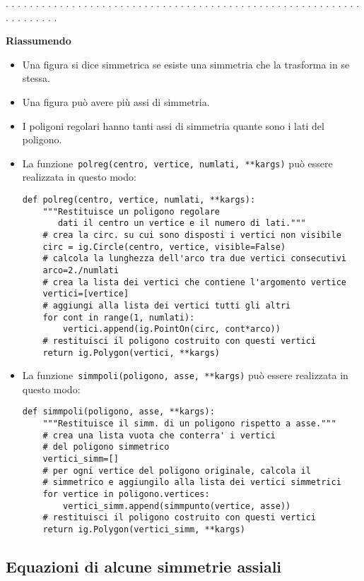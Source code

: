 . . . . . . . . . . . . . . . . . . . . . . . . . . . . . . . . . . . . . . . .
. . . . . . . . . . . . . . . . . . . . . . . . . . . .

\textbf{Riassumendo}
\begin{itemize} [noitemsep]
\item Una figura si dice simmetrica se esiste una simmetria che la trasforma in
se stessa.
\item Una figura può avere più assi di simmetria.
\item I poligoni regolari hanno tanti assi di simmetria quante sono i lati del
poligono.
\item La funzione~\lstinline{polreg(centro, vertice, numlati, **kargs)} può 
essere
realizzata in questo modo:

\begin{lstlisting}
def polreg(centro, vertice, numlati, **kargs):
    """Restituisce un poligono regolare 
       dati il centro un vertice e il numero di lati."""
    # crea la circ. su cui sono disposti i vertici non visibile
    circ = ig.Circle(centro, vertice, visible=False)
    # calcola la lunghezza dell'arco tra due vertici consecutivi
    arco=2./numlati
    # crea la lista dei vertici che contiene l'argomento vertice
    vertici=[vertice]
    # aggiungi alla lista dei vertici tutti gli altri
    for cont in range(1, numlati):
        vertici.append(ig.PointOn(circ, cont*arco))
    # restituisci il poligono costruito con questi vertici
    return ig.Polygon(vertici, **kargs)
\end{lstlisting}
\item La funzione~\lstinline{simmpoli(poligono, asse, **kargs)} può essere
realizzata in questo modo:

\begin{lstlisting}
def simmpoli(poligono, asse, **kargs):
    """Restituisce il simm. di un poligono rispetto a asse."""
    # crea una lista vuota che conterra' i vertici
    # del poligono simmetrico
    vertici_simm=[]
    # per ogni vertice del poligono originale, calcola il 
    # simmetrico e aggiungilo alla lista dei vertici simmetrici
    for vertice in poligono.vertices:
        vertici_simm.append(simmpunto(vertice, asse))
    # restituisci il poligono costruito con questi vertici
    return ig.Polygon(vertici_simm, **kargs)
\end{lstlisting}

\end{itemize}


\subsection{Equazioni di alcune simmetrie assiali}

